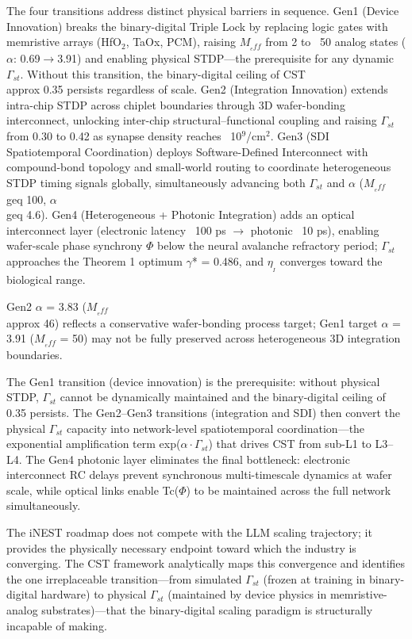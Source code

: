 \documentclass[a4paper,12pt]{article}
\begin{document}
The four transitions address distinct physical barriers in sequence. Gen1 (Device Innovation) breaks the binary-digital Triple Lock by replacing logic gates with memristive arrays (HfO$_2$, TaOx, PCM), raising $M_{_eff}$ from 2 to ~50 analog states ($\alpha$: 0.69$\rightarrow$3.91) and enabling physical STDP---the prerequisite for any dynamic $\Gamma_{st}$. Without this transition, the binary-digital ceiling of CST  \\approx  0.35 persists regardless of scale. Gen2 (Integration Innovation) extends intra-chip STDP across chiplet boundaries through 3D wafer-bonding interconnect, unlocking inter-chip structural--functional coupling and raising $\Gamma_{st}$ from 0.30 to 0.42 as synapse density reaches ~10$^9$/cm$^2$. Gen3 (SDI Spatiotemporal Coordination) deploys Software-Defined Interconnect with compound-bond topology and small-world routing to coordinate heterogeneous STDP timing signals globally, simultaneously advancing both $\Gamma_{st}$ and $\alpha$ ($M_{_eff}$  \\geq  100, $\alpha$  \\geq  4.6). Gen4 (Heterogeneous + Photonic Integration) adds an optical interconnect layer (electronic latency ~100 ps $\rightarrow$ photonic ~10 ps), enabling wafer-scale phase synchrony $\Phi$ below the neural avalanche refractory period; $\Gamma_{st}$ approaches the Theorem 1 optimum $\gamma$* = 0.486, and $\eta_{_I}$ converges toward the biological range.


\dag{}Gen2 $\alpha$ = 3.83 ($M_{_eff}$  \\approx  46) reflects a conservative wafer-bonding process target; Gen1 target $\alpha$ = 3.91 ($M_{_eff}$ = 50) may not be fully preserved across heterogeneous 3D integration boundaries.


The Gen1 transition (device innovation) is the prerequisite: without physical STDP, $\Gamma_{st}$ cannot be dynamically maintained and the binary-digital ceiling of 0.35 persists. The Gen2--Gen3 transitions (integration and SDI) then convert the physical $\Gamma_{st}$ capacity into network-level spatiotemporal coordination---the exponential amplification term exp($\alpha \cdot \Gamma_{st}$) that drives CST from sub-L1 to L3--L4. The Gen4 photonic layer eliminates the final bottleneck: electronic interconnect RC delays prevent synchronous multi-timescale dynamics at wafer scale, while optical links enable Tc($\Phi$) to be maintained across the full network simultaneously.


The iNEST roadmap does not compete with the LLM scaling trajectory; it provides the physically necessary endpoint toward which the industry is converging. The CST framework analytically maps this convergence and identifies the one irreplaceable transition---from simulated $\Gamma_{st}$ (frozen at training in binary-digital hardware) to physical $\Gamma_{st}$ (maintained by device physics in memristive-analog substrates)---that the binary-digital scaling paradigm is structurally incapable of making.
\end{document}
